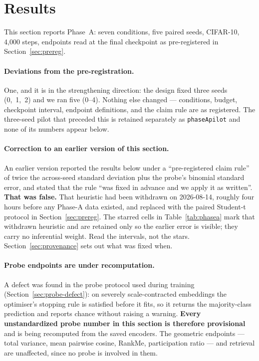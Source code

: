 \section{Results}
\label{sec:results}

This section reports Phase~A: seven conditions, five paired seeds, CIFAR-10, 4{,}000 steps,
endpoints read at the final checkpoint as pre-registered in Section~\ref{sec:prereg}.

\paragraph{Deviations from the pre-registration.} One, and it is in the strengthening
direction: the design fixed three seeds (0,~1,~2) and we ran five (0--4). Nothing else
changed --- conditions, budget, checkpoint interval, endpoint definitions, and the claim
rule are as registered. The three-seed pilot that preceded this is retained separately as
\texttt{phaseApilot} and none of its numbers appear below.

\paragraph{Correction to an earlier version of this section.} An earlier version reported
the results below under a ``pre-registered claim rule'' of twice the across-seed standard
deviation plus the probe's binomial standard error, and stated that the rule ``was fixed in
advance and we apply it as written''. \textbf{That was false.} That heuristic had been
withdrawn on 2026-08-14, roughly four hours before any Phase-A data existed, and replaced
with the paired Student-t protocol in Section~\ref{sec:prereg}. The starred cells in
Table~\ref{tab:phasea} mark that withdrawn heuristic and are retained only so the earlier
error is visible; they carry no inferential weight. Read the intervals, not the stars.
Section~\ref{sec:provenance} sets out what was fixed when.

\paragraph{Probe endpoints are under recomputation.} A defect was found in the probe
protocol used during training (Section~\ref{sec:probe-defect}): on severely
scale-contracted embeddings the optimiser's stopping rule is satisfied before it fits, so
it returns the majority-class prediction and reports chance without raising a warning.
\textbf{Every unstandardized probe number in this section is therefore provisional} and is
being recomputed from the saved encoders. The geometric endpoints --- total variance, mean
pairwise cosine, RankMe, participation ratio --- and retrieval are unaffected, since no
probe is involved in them.

